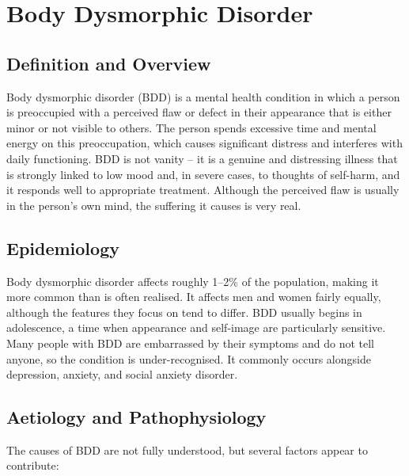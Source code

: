 \chapter{Body Dysmorphic Disorder}

\section*{Definition and Overview}
Body dysmorphic disorder (BDD) is a mental health condition in which a person is preoccupied with a perceived flaw or defect in their appearance that is either minor or not visible to others. The person spends excessive time and mental energy on this preoccupation, which causes significant distress and interferes with daily functioning. BDD is not vanity -- it is a genuine and distressing illness that is strongly linked to low mood and, in severe cases, to thoughts of self-harm, and it responds well to appropriate treatment. Although the perceived flaw is usually in the person's own mind, the suffering it causes is very real.

\section*{Epidemiology}
Body dysmorphic disorder affects roughly 1--2\% of the population, making it more common than is often realised. It affects men and women fairly equally, although the features they focus on tend to differ. BDD usually begins in adolescence, a time when appearance and self-image are particularly sensitive. Many people with BDD are embarrassed by their symptoms and do not tell anyone, so the condition is under-recognised. It commonly occurs alongside depression, anxiety, and social anxiety disorder.

\section*{Aetiology and Pathophysiology}
The causes of BDD are not fully understood, but several factors appear to contribute:

